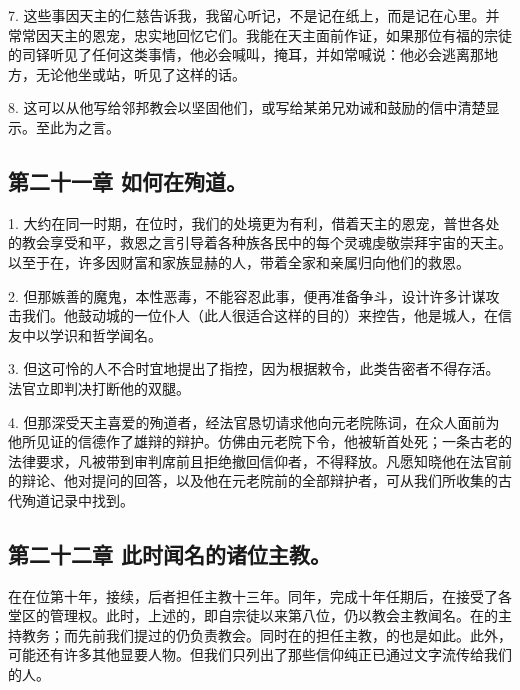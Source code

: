 7. 这些事因天主的仁慈告诉我，我留心听记，不是记在纸上，而是记在心里。并常常因天主的恩宠，忠实地回忆它们。我能在天主面前作证，如果那位有福的宗徒的司铎听见了任何这类事情，他必会喊叫，掩耳，并如常喊说：他必会逃离那地方，无论他坐或站，听见了这样的话。\par

8. 这可以从他写给邻邦教会以坚固他们，或写给某弟兄劝诫和鼓励的信中清楚显示。至此为之言。\par


\subsection{第二十一章 如何在殉道。}

1. 大约在同一时期，在位时，我们的处境更为有利，借着天主的恩宠，普世各处的教会享受和平，救恩之言引导着各种族各民中的每个灵魂虔敬崇拜宇宙的天主。以至于在，许多因财富和家族显赫的人，带着全家和亲属归向他们的救恩。\par

2. 但那嫉善的魔鬼，本性恶毒，不能容忍此事，便再准备争斗，设计许多计谋攻击我们。他鼓动城的一位仆人（此人很适合这样的目的）来控告，他是城人，在信友中以学识和哲学闻名。\par

3. 但这可怜的人不合时宜地提出了指控，因为根据敕令，此类告密者不得存活。法官立即判决打断他的双腿。\par

4. 但那深受天主喜爱的殉道者，经法官恳切请求他向元老院陈词，在众人面前为他所见证的信德作了雄辩的辩护。仿佛由元老院下令，他被斩首处死；一条古老的法律要求，凡被带到审判席前且拒绝撤回信仰者，不得释放。凡愿知晓他在法官前的辩论、他对提问的回答，以及他在元老院前的全部辩护者，可从我们所收集的古代殉道记录中找到。\par


\subsection{第二十二章 此时闻名的诸位主教。}

在在位第十年，接续，后者担任主教十三年。同年，完成十年任期后，在接受了各堂区的管理权。此时，上述的，即自宗徒以来第八位，仍以教会主教闻名。在的主持教务；而先前我们提过的仍负责教会。同时在的担任主教，的也是如此。此外，可能还有许多其他显要人物。但我们只列出了那些信仰纯正已通过文字流传给我们的人。\par


